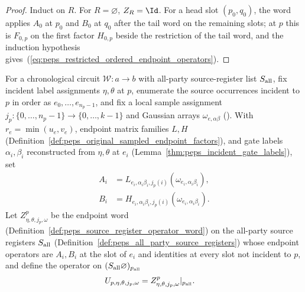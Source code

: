 \begin{proof}
    \leanok
    Induct on $R$. For $R=\varnothing$, $Z_R=\Id$. For a head slot
    $(p_0,q_0)$, the word applies $A_0$ at $p_0$ and $B_0$ at $q_0$ after the
    tail word on the remaining slots; at $p$ this is $F_{0,p}$ on the first
    factor $H_{0,p}$ beside the restriction of the tail word, and the induction
    hypothesis gives~(\ref{eq:peps_restricted_ordered_endpoint_operators}).
\end{proof}

\begin{definition}
    \label{def:peps_incident_sampled_endpoint_word}
    \leanok
    For a chronological circuit $\mathcal W:a\to b$ with all-party
    source-register list $S_{\rm all}$, fix incident label assignments
    $\eta,\theta$ at $p$, enumerate the source occurrences incident to $p$ in
    order as $e_0,\ldots,e_{n_p-1}$, and fix a local sample assignment
    $j_p:\{0,\ldots,n_p-1\}\to\{0,\ldots,k-1\}$ and Gaussian arrays
    $\omega_{e,\alpha\beta}$ (\cite[proof of Theorem~5.2]{OpenAI2026PolynomialPEPS}).
    With $r_e=\min(u_e,v_e)$, endpoint matrix families $L,H$
    (Definition~\ref{def:peps_original_sampled_endpoint_factors}), and gate
    labels $\alpha_i,\beta_i$ reconstructed from $\eta,\theta$ at $e_i$
    (Lemma~\ref{thm:peps_incident_gate_labels}), set
    \begin{align}
        A_i & =L_{e_i,\alpha_i\beta_i,j_p(i)}
        (\omega_{e_i,\alpha_i\beta_i}),       \\
        B_i & =H_{e_i,\alpha_i\beta_i,j_p(i)}
        (\omega_{e_i,\alpha_i\beta_i}).
        \label{eq:peps_incident_sampled_endpoints}
    \end{align}
    Let $Z^{p}_{\eta,\theta,j_p,\omega}$ be the endpoint word
    (Definition~\ref{def:peps_source_register_operator_word}) on the all-party
    source registers $S_{\rm all}$
    (Definition~\ref{def:peps_all_party_source_registers}) whose endpoint
    operators are $A_i,B_i$ at the slot of $e_i$ and identities at every slot
    not incident to $p$, and define the operator on
    $(S_{\rm all}\varnothing)_{p_{\rm all}}$
    \begin{align}
        U_{p,\eta,\theta,j_p,\omega}
         & =Z^{p}_{\eta,\theta,j_p,\omega}|_{p_{\rm all}}.
        \label{eq:peps_incident_endpoint_word}
    \end{align}
\end{definition}


